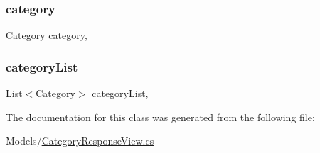 \subsubsection{\texorpdfstring{category}{category}}
{\footnotesize\ttfamily \hyperlink{classWildlifeTrackingApp_1_1Models_1_1Category}{Category} category\hspace{0.3cm}{\ttfamily [get]}, {\ttfamily [set]}}

\mbox{\label{classWildlifeTrackingApp_1_1Models_1_1CategoryResponseView_ac20f04846190de6a34eadd21501afae3}} 
\subsubsection{\texorpdfstring{category\+List}{categoryList}}
{\footnotesize\ttfamily List$<$\hyperlink{classWildlifeTrackingApp_1_1Models_1_1Category}{Category}$>$ category\+List\hspace{0.3cm}{\ttfamily [get]}, {\ttfamily [set]}}



The documentation for this class was generated from the following file\+:\begin{DoxyCompactItemize}
\item 
Models/\hyperlink{CategoryResponseView_8cs}{Category\+Response\+View.\+cs}\end{DoxyCompactItemize}

